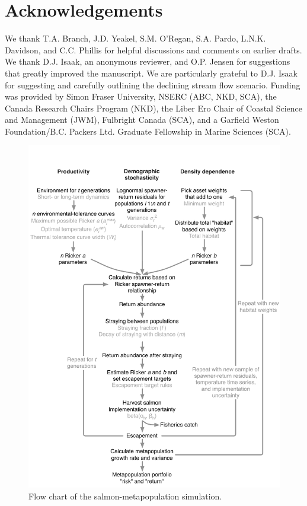 \section{Acknowledgements}

We thank T.A. Branch, J.D. Yeakel, S.M. O'Regan, S.A. Pardo, L.N.K. Davidson, and C.C. Phillis for helpful discussions and comments on earlier drafts. We thank D.J. Isaak, an anonymous reviewer, and O.P. Jensen for suggestions that greatly improved the manuscript. We are particularly grateful to D.J. Isaak for suggesting and carefully outlining the declining stream flow scenario. Funding was provided by Simon Fraser University, NSERC (ABC, NKD, SCA), the Canada Research Chairs Program (NKD), the Liber Ero Chair of Coastal Science and Management (JWM), Fulbright Canada (SCA), and a Garfield Weston Foundation/B.C. Packers Ltd. Graduate Fellowship in Marine Sciences (SCA).

\begin{figure}[htbp]
\centering
\includegraphics[width=5in]{metafolio/Fig1.pdf}
\caption{
Flow chart of the salmon-metapopulation simulation.
} \label{f:flowchart}
\end{figure}


